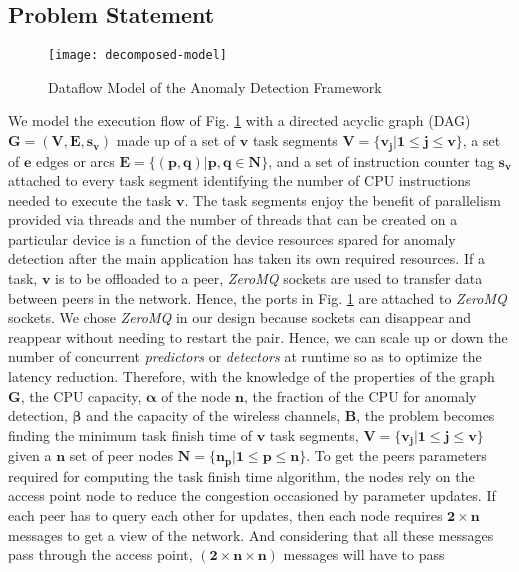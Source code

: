 \subsection{Problem Statement}
\label{subsec:problem-formulation}
\begin{figure}[!t]
	\centering
	\texttt{[image: decomposed-model]}
	\caption{Dataflow Model of the Anomaly 
		Detection Framework}
	\label{fig:dataflow-model}
\end{figure}
We model the execution flow of Fig. \ref{fig:dataflow-model} 
with a directed acyclic graph (DAG) $ \bm{G=(V,E,s_v)} 
$ made up of a set of $ \bm{v} $ task segments $ {
\bm{V=\{v_j|1\leq j\leq v\}}} $, a set of $ \bm{e} $ edges or 
arcs 
$ \bm{E=\{(p,q)|p,q \in N\}} $, and a set of instruction 
counter tag $ \bm{s_v} $ attached to every task segment 
identifying the number of CPU instructions needed to execute 
the task $ \bm{v} $. The task segments enjoy the benefit of 
parallelism provided via threads and the number of threads 
that can be created on a particular device is a function of 
the device resources spared for anomaly detection after the 
main application has taken its own required resources. If a 
task, $ \bm{v} $ is to be offloaded to a peer, \emph{ZeroMQ} 
sockets are used to transfer data between peers in the 
network. Hence, the ports in Fig. \ref{fig:dataflow-model} 
are attached to \emph{ZeroMQ} sockets. We chose \emph{ZeroMQ} 
in our design because sockets can disappear and reappear 
without needing to restart the pair. Hence, we can scale up 
or down the number of concurrent \emph{predictors} or 
\emph{detectors} at runtime so as to optimize the latency 
reduction. Therefore, with the knowledge of the properties of 
the graph $ \bm{G} $, the CPU capacity, $ \bm{\alpha} $ of 
the node $ \bm{n} $, the 
fraction of the CPU for anomaly detection, $ \bm{\beta} $ 
and 
the capacity of the wireless channels, $ \bm{B} $, the 
problem becomes finding the minimum task finish time of $ 
\bm{v} $ task segments, ${ \bm{V=\{v_j|1\leq j \leq v\}}} $ 
given a $ \bm{n} $ set of peer nodes ${ \bm{N=\{n_p|1 \leq p 
\leq n\}}} $. To get the peers parameters required for 
computing the task finish time algorithm, the nodes 
rely on the access point node to reduce the congestion 
occasioned by parameter updates. If each peer has to query 
each other for updates, then each node requires $ \bm{2 
\times n} $ messages to get a view of the network. And 
considering that all these messages pass through the access 
point, ${ \bm{(2\times n\times n)}} $ messages will have to 
pass 
